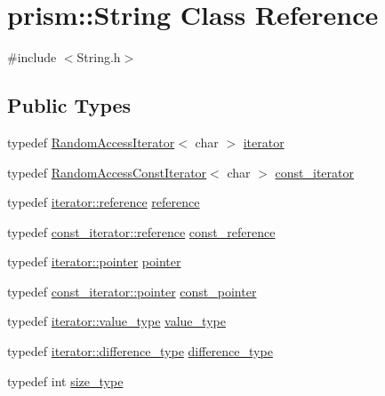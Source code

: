 \hypertarget{classprism_1_1_string}{}\section{prism\+:\+:String Class Reference}
\label{classprism_1_1_string}


{\ttfamily \#include $<$String.\+h$>$}

\subsection*{Public Types}
\begin{DoxyCompactItemize}
\item 
typedef \hyperlink{classprism_1_1_random_access_iterator}{Random\+Access\+Iterator}$<$ char $>$ \hyperlink{classprism_1_1_string_adacc7975837e5fff95d70690777fb330}{iterator}
\item 
typedef \hyperlink{classprism_1_1_random_access_const_iterator}{Random\+Access\+Const\+Iterator}$<$ char $>$ \hyperlink{classprism_1_1_string_a8b46f0fbe9c5c94ba892975242e3ab68}{const\+\_\+iterator}
\item 
typedef \hyperlink{classprism_1_1_forward_iterator_a4f7bff2c238f447c1537c74fe09f8935}{iterator\+::reference} \hyperlink{classprism_1_1_string_a0abe551090035c27a0f80ea403199727}{reference}
\item 
typedef \hyperlink{classprism_1_1_forward_const_iterator_a839eeb121503b031260ad21ef844dd9a}{const\+\_\+iterator\+::reference} \hyperlink{classprism_1_1_string_a7825c62cb2047e36ec704a17ef94f299}{const\+\_\+reference}
\item 
typedef \hyperlink{classprism_1_1_forward_iterator_af50dd6e13f3cea3ee3b2332e48996502}{iterator\+::pointer} \hyperlink{classprism_1_1_string_ac7944d9212ad675ba05280657ce14d12}{pointer}
\item 
typedef \hyperlink{classprism_1_1_forward_const_iterator_a6e4e245d3ab99d6e9b237abe2c0c06d8}{const\+\_\+iterator\+::pointer} \hyperlink{classprism_1_1_string_adbea4cbf0f4f62948eb2accf7d402456}{const\+\_\+pointer}
\item 
typedef \hyperlink{classprism_1_1_forward_iterator_a7a28958d2cf2ea2613c6f0f011759781}{iterator\+::value\+\_\+type} \hyperlink{classprism_1_1_string_a9808c1cb8dbe4ec046174c3318e577b7}{value\+\_\+type}
\item 
typedef \hyperlink{classprism_1_1_forward_iterator_a8c90486e85c02351c2e957ba3247ab10}{iterator\+::difference\+\_\+type} \hyperlink{classprism_1_1_string_a50fc3d423db1d24c511b28b24e4a7c00}{difference\+\_\+type}
\item 
typedef int \hyperlink{classprism_1_1_string_a33d0fff8e7a3f85f43487c6975e3e766}{size\+\_\+type}
\end{DoxyCompactItemize}

